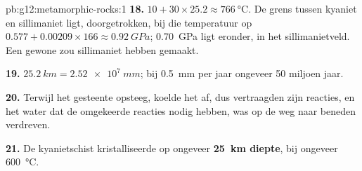 \begin{solution}{pb:g12:metamorphic-rocks:1}
\textbf{18.} $10 + 30 \times 25.2 \approx \qty{766}{\celsius}$. De
grens tussen kyaniet en sillimaniet ligt, doorgetrokken, bij die temperatuur op $0.577 + 0.00209 \times 166
\approx \qty{0.92}{GPa}$; \qty{0.70}{GPa} ligt eronder,
in het sillimanietveld. Een gewone  zou sillimaniet hebben gemaakt.

\textbf{19.} $\qty{25.2}{km} = \qty{2.52e7}{mm}$; bij \qty{0.5}{mm} per jaar
ongeveer 50 miljoen jaar.

\textbf{20.} Terwijl het gesteente opsteeg, koelde het af, dus vertraagden zijn reacties, en
het water dat de omgekeerde reacties nodig hebben, was op de weg naar beneden
verdreven.

\textbf{21.} De kyanietschist kristalliseerde op ongeveer \textbf{\qty{25}{km}
diepte}, bij ongeveer \qty{600}{\celsius}.
\end{solution}
